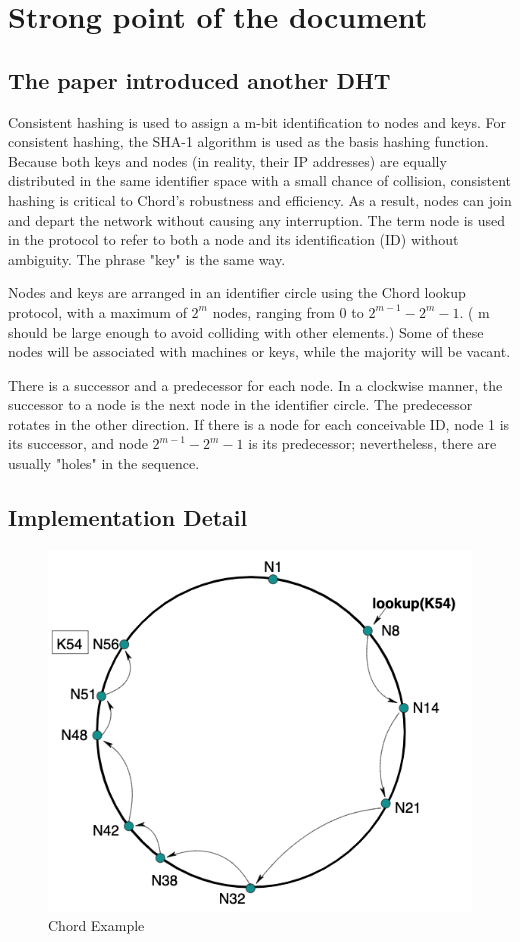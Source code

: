 \documentclass[acmlarge]{acmart}
\begin{document}
\maketitle
\section{Strong point of the document}

\subsection{The paper introduced another DHT}
Consistent hashing is used to assign a m-bit identification to nodes and keys. For consistent hashing, the SHA-1 algorithm is used as the basis hashing function. Because both keys and nodes (in reality, their IP addresses) are equally distributed in the same identifier space with a small chance of collision, consistent hashing is critical to Chord's robustness and efficiency. As a result, nodes can join and depart the network without causing any interruption. The term node is used in the protocol to refer to both a node and its identification (ID) without ambiguity. The phrase "key" is the same way.

Nodes and keys are arranged in an identifier circle using the Chord lookup protocol, with a maximum of $2^m$ nodes, ranging from 0 to $2^{m-1}-2^m - 1$. ( m should be large enough to avoid colliding with other elements.) Some of these nodes will be associated with machines or keys, while the majority will be vacant.

There is a successor and a predecessor for each node. In a clockwise manner, the successor to a node is the next node in the identifier circle. The predecessor rotates in the other direction. If there is a node for each conceivable ID, node 1 is its successor, and node $2^{m-1}-2^m - 1$ is its predecessor; nevertheless, there are usually "holes" in the sequence.
\subsection{Implementation Detail}

\begin{figure}[htbp]
  \centering
  \includegraphics[width=0.4\columnwidth]{./DI.png}
  \caption{Chord Example}
\end{figure}
\end{document}
